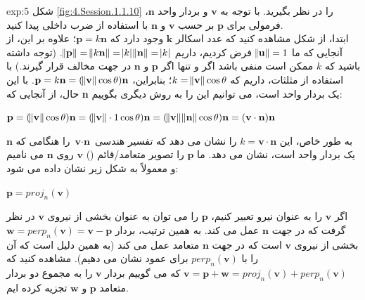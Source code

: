 {\begin{spacing}{1.5}
        \textbf{\vspace{-20pt}}
        \begin{example}{exp:5}
            شکل \ref{fig:4.Session.1.1.10} را در نظر بگیرید.
            با توجه به $\textbf{v}$ و بردار واحد $\textbf{n}$، فرمولی برای $\textbf{p}$ بر حسب $\textbf{v}$ و $\textbf{n}$ با استفاده از ضرب داخلی پیدا کنید. \\
            ابتدا، از شکل مشاهده کنید که عدد اسکالر $\textbf{k}$ وجود دارد
            که $\textbf{p}=k\textbf{n}$؛ علاوه بر این، از آنجایی که ما $\norm{\textbf{u}}=1$ فرض کردیم،
            داریم $\norm{\textbf{p}}=\norm{k\textbf{n}}=\abs{k}\norm{\textbf{n}}=\abs{k}$.
            (توجه داشته باشید که $k$ ممکن است منفی باشد اگر و تنها اگر $\textbf{p}$ و $\textbf{n}$ در جهت مخالف قرار گیرند.)
            با استفاده از مثلثات، داریم که $k=\norm{\textbf{v}}\cos\theta$؛
            بنابراین، $\textbf{p}=k\textbf{n}=(\norm{\textbf{v}}\cos\theta)\textbf{n}$.
            با این حال، از آنجایی که \textbf{n} یک بردار واحد است، می توانیم این را به روش دیگری بگوییم:

            \begin{center}
                $\textbf{p}=(\norm{\textbf{v}}\cos\theta)\textbf{n}=(\norm{\textbf{v}}\cdot 1\cos\theta)\textbf{n}=(\norm{\textbf{v}}\norm{\textbf{n}}\cos\theta)\textbf{n}=(\textbf{v}\cdot\textbf{n})\textbf{n}$
            \end{center}

            به طور خاص، این $k=\textbf{v}\cdot\textbf{n}$ را نشان می دهد که تفسیر هندسی $\textbf{v}\cdot\textbf{n}$ را هنگامی که $\textbf{n}$ یک بردار واحد است، نشان می دهد. ما $\textbf{p}$ را تصویر متعامد/قائم () $\textbf{v}$ روی $\textbf{n}$ می نامیم و معمولاً به شکل زیر نشان داده می شود:

            \begin{center}
                $\textbf{p}=proj_{n}(\textbf{v})$
            \end{center}

            اگر $\textbf{v}$ را به عنوان نیرو تعبیر کنیم، $\textbf{p}$ را می توان به عنوان بخشی از نیروی $\textbf{v}$ در نظر گرفت که در جهت $\textbf{n}$ عمل می کند.
            به همین ترتیب، بردار $\textbf{w}=perp_{n}(\textbf{v})=\textbf{v}-\textbf{p}$ بخشی از نیروی $\textbf{v}$ است که در جهت $\textbf{n}$ متعامد عمل می کند
            (به همین دلیل است که آن را با $perp_{n}(\textbf{v})$ برای عمود نشان می دهیم).
            مشاهده کنید که $\textbf{v}=\textbf{p}+\textbf{w}=proj_{n}(\textbf{v})+perp_{n}(\textbf{v})$ که می گوییم بردار $\textbf{v}$ را به مجموع دو بردار متعامد $\textbf{p}$ و $\textbf{w}$ تجزیه کرده ایم.


\end{example}
\end{spacing}}
